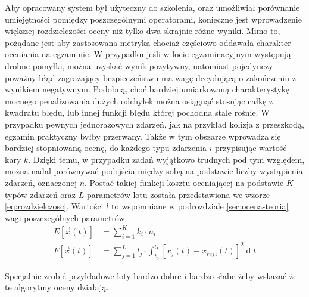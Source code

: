 Aby opracowany system był użyteczny do szkolenia, oraz umożliwiał porównanie umiejętności pomiędzy poszczególnymi operatorami, konieczne jest wprowadzenie większej rozdzielczości oceny niż tylko dwa skrajnie różne wyniki. Mimo to, pożądane jest aby zastosowana metryka chociaż częściowo oddawała charakter oceniania na egzaminie. W przypadku jeśli w locie egzaminacyjnym występują drobne pomyłki, można uzyskać wynik pozytywny, natomiast pojedynczy poważny błąd zagrażający bezpieczeństwu ma wagę decydującą o zakończeniu z wynikiem negatywnym. Podobną, choć bardziej umiarkowaną charakterystykę mocnego penalizowania dużych odchyłek można osiągnąć stosując całkę z kwadratu błędu, lub innej funkcji błędu której pochodna stale rośnie. W przypadku pewnych jednorazowych zdarzeń, jak na przykład kolizja z przeszkodą, egzamin praktyczny byłby przerwany. Także w tym obszarze wprowadza się bardziej stopniowaną ocenę, do każdego typu zdarzenia $ i $ przypisując wartość kary $ k $. Dzięki temu, w przypadku zadań wyjątkowo trudnych pod tym względem, można nadal porównywać podejścia między sobą na podstawie liczby wystąpienia zdarzeń, oznaczonej $ n $. Postać takiej funkcji kosztu oceniającej na podstawie $ K $ typów zdarzeń oraz $ L $ parametrów lotu została przedstawiona we wzorze \ref{eq:rozdzielczosc}. Wartości $ l $ to wspomniane w podrozdziale \ref{sec:ocena-teoria} wagi poszczególnych parametrów.
\begin{align}
    \label{eq:rozdzielczosc}
    E[ \vec{x}(t) ] &= \sum_{i=1}^{K} k_i \cdot n_i
    \\
    F[ \vec{x}(t) ] &= \sum_{j=1}^{L} l_j \cdot \int_{t_0}^{t_k} [ x_j(t) - x_{ref_j}(t) ]^2 \operatorname{d}t
\end{align}

\begin{todo}
    Specjalnie zrobić przykładowe loty bardzo dobre i bardzo słabe żeby wskazać że te algorytmy oceny działają.
\end{todo}